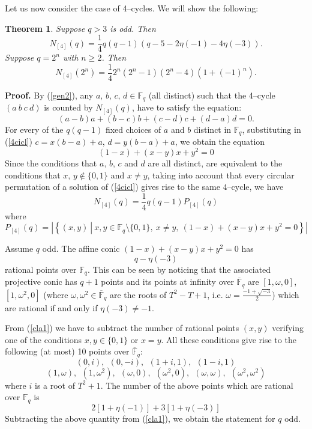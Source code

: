 \documentclass[10pt,a4paper,twoside]{article}
\def\Fq{{\mathbb{F}}_q}
\def\oFq{\overline{\mathbb{F}}_q}
\newtheorem{theorem}{Theorem}[section]
\begin{document}
Let us now consider the case of 4--cycles. We will show the following:

\begin{theorem} Suppose $q>3$ is odd. Then
$$N_{[4]}(q)=\frac{1}{4}q(q-1)\left(q-5-2\eta(-1)-4\eta(-3)\right).$$
Suppose $q=2^n$ with $n\geq2$. Then
$$N_{[4]}(2^n)=\frac{1}{4}2^n(2^n-1)(2^{n}-4)(1+(-1)^n).$$
\end{theorem}

\noindent\textbf{Proof.} By (\ref{gen2}), any $a,\,b,\,c,\,d\in\Fq$
(all distinct)
such that the 4--cycle $(a\ b\ c\ d)$ is counted by $N_{[4]}(q)$,
have to satisfy the equation:
\begin{equation}\label{4cicl}
(a-b)a+(b-c)b+(c-d)c+(d-a)d=0.
\end{equation}
For every of the $q(q-1)$ fixed choices of $a$ and $b$ distinct in $\Fq$,
substituting in (\ref{4cicl}) $c=x(b-a)+a$, $d=y(b-a)+a$, we obtain the equation
\begin{equation}\label{normal}
  (1-x)+(x-y)x+y^2=0
\end{equation}
Since the conditions that $a,\,b,\,c$ and $d$ are all distinct, are equivalent
to the conditions that $x,\,y\not\in\{0,1\}$ and $x\neq y$, taking into account
that every circular permutation of a solution of (\ref{4cicl}) gives rise to the
same $4$--cycle, we have
$$N_{[4]}(q)=\frac{1}{4}q(q-1)P_{[4]}(q)$$
where
$$P_{[4]}(q)=\left|\left\{(x,y)\
\left|\ x,y\in\Fq\setminus\{0,1\},\ x\neq y,\ (1-x)+(x-y)x+y^2=0\right.\right\}
\right|$$

Assume $q$ odd. The affine conic $(1-x)+(x-y)x+y^2=0$ has
\begin{equation}\label{cla1}
q-\eta(-3)
\end{equation}
rational points over $\Fq$. This can be seen by noticing that
the associated projective conic has $q+1$ points and its points at infinity
over $\oFq$ are $[1,\omega,0]$,
$[1,\omega^2,0]$ (where $\omega,\omega^2\in\oFq$ are
the roots of $T^2-T+1$, i.e. $\omega=\frac{-1+\sqrt{-3}}{2}$)  which
are rational if and only if $\eta(-3)\neq-1$.

From (\ref{cla1}) we have to subtract the number of rational points $(x,y)$ verifying
one of the conditions $x, y\in\{0,1\}$ or $x=y$. All these conditions give rise to
the following (at most) 10 points over $\oFq$:
$$(0,i),\ \ (0,-i),\ \ (1+i,1),\ \ (1-i,1)$$
$$(1,\omega),\ \ (1,{\omega}^2),\ \ (\omega,0),\ \ ({\omega}^2,0),\ \
(\omega,\omega),\ \ ({\omega}^2,{\omega}^2)$$
where $i$ is a root of $T^2+1$. The number of the above points which are
rational over $\Fq$ is
$$2\left[1+\eta(-1)\right]+
  3\left[1+\eta(-3)\right]$$
Subtracting the above quantity from (\ref{cla1}), we obtain the statement for $q$ odd.
\end{document}
